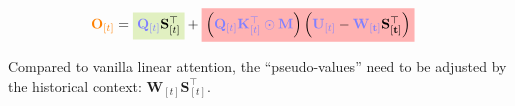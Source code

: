 \begin{frame}{}
    
      \begin{align*}
        {\color{orange}\mathbf{O}_{[t]}} &= \colorbox{yellowgreen!30}{${\color{blue!50}\mathbf{Q}_{[t]}}\mathbf{S}_{[t]}^\top$} + \colorbox{red!30}{$\left({\color{blue!50}\mathbf{Q}_{[t]}\mathbf{K}_{[t]}^\top \odot \mathbf{M}}\right)\left({\color{blue!50}\mathbf{U}_{[t]}}-{\color{blue!50}\mathbf{W_{[t]}}}\mathbf{S_{[t]}^\top} \right)$}
      \end{align*}
      
      Compared to vanilla linear attention, the ``pseudo-values'' need to be adjusted by the historical context: $\mathbf{W}_{[t]}\mathbf{S}_{[t]}^\top$.
\end{frame}



